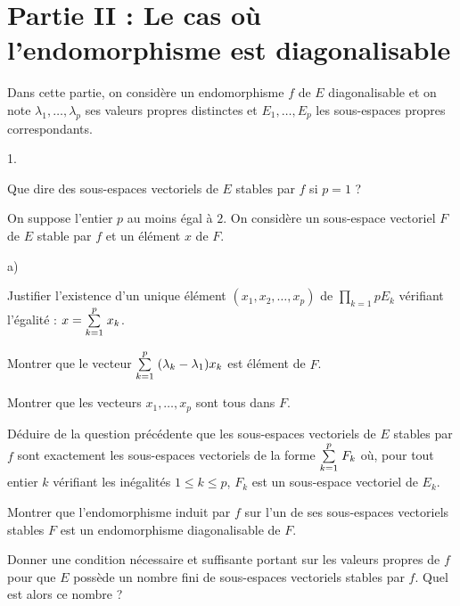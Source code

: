 \documentclass[11pt]{article}%
\begin{document}
\section*{Partie II : {Le cas où l'endomorphisme est diagonalisable}}

Dans cette partie, on considère un endomorphisme $f$ de $E$
diagonalisable
et on note $\lambda_{1},\dots,\lambda_{p}$ ses valeurs propres
distinctes
et $E_{1},\dots,E_{p}$ les sous-espaces propres correspondants.

\begin{noliste}{1.}
 \setlength{\itemsep}{4mm}
\item Que dire des sous-espaces vectoriels de $E$ stables par $f$ si $p
= 1$ ?

\item On suppose l'entier $p$ au moins égal à $2$. On considère un
sous-espace vectoriel $F$ de $E$ stable par $f$ et un élément $x$ de
$F$.

\begin{noliste}{a)}
 \setlength{\itemsep}{2mm}
\item Justifier l'existence d'un unique élément
$(x_{1},x_{2},\dots,x_{p})$
de $\prod\limits_{k = 1}{p}E_{k}$ vérifiant l'égalité : $x = {\textstyle\sum\limits_{k =
1}^{p}}\hspace{.1cm}x_{k}$.

\item Montrer que le vecteur ${\textstyle\sum\limits_{k = 1}^{p}}\hspace{.1cm}(\lambda_{k}-\lambda
_{1})x_{k}$ est élément de $F$.

\item Montrer que les vecteurs $x_{1},\dots,x_{p}$ sont tous dans $F$.
\end{noliste}

\item Déduire de la question précédente que les sous-espaces vectoriels
de $E $ stables par $f$ sont exactement les sous-espaces vectoriels de
la forme ${\textstyle\sum\limits_{k = 1}^{p}}\hspace{.1cm}F_{k}$ où, pour tout entier $k$ vérifiant les
inégalités $1\leq k\leq p$, $F_{k}$ est un sous-espace vectoriel de
$E_{k}$.

\item Montrer que l'endomorphisme induit par $f$ sur l'un de ses
sous-espaces vectoriels stables $F$ est un endomorphisme diagonalisable
de $F $.

\item Donner une condition nécessaire et suffisante portant sur les
valeurs
propres de $f$ pour que $E$ possède un nombre fini de sous-espaces
vectoriels stables par $f$. Quel est alors ce nombre ?
\end{noliste}
\end{document}
